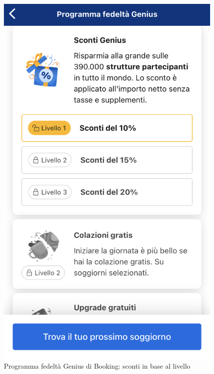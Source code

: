 \begin{figure}
\begin{minipage}[h]{0.4\linewidth}
        \includegraphics[width=1\textwidth]{img/booking-gamification.PNG}
        \caption{Programma fedeltà Genius di Booking: sconti in base al livello}
        \label{fig:booking-genius}
    \end{minipage}
    \vfill
    \vspace{0.2 cm}
    \centering
    \begin{minipage}[h]{0.4\linewidth}
        \centering

\end{minipage}
\end{figure}
